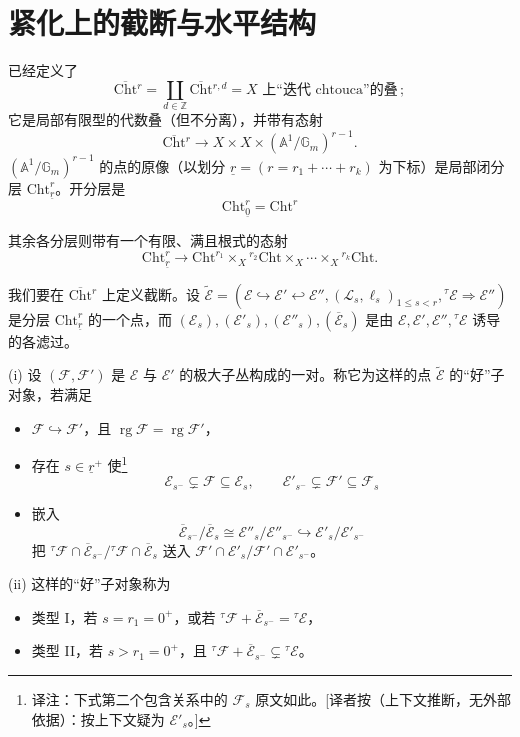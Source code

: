 \section{紧化上的截断与水平结构}

已经定义了
\[
\overline{\mathrm{Cht}}{}^r=\coprod_{d\in\mathbb{Z}}\overline{\mathrm{Cht}}{}^{r,d}=\text{$X$ 上“迭代 chtouca”的叠}\,;
\]
它是局部有限型的代数叠（但不分离），并带有态射
\[
\overline{\mathrm{Cht}}{}^r\to X\times X\times(\mathbb{A}^1/\mathbb{G}_m)^{r-1}.
\]
$(\mathbb{A}^1/\mathbb{G}_m)^{r-1}$ 的点的原像（以划分 $\underline{r}=(r=r_1+\cdots+r_k)$ 为下标）是局部闭分层 $\mathrm{Cht}^r_{\underline{r}}$。开分层是
\[
\mathrm{Cht}^r_{\underline{0}}=\mathrm{Cht}^r
\]

其余各分层则带有一个有限、满且根式的态射
\[
\mathrm{Cht}^r_{\underline{r}}\to\mathrm{Cht}^{r_1}\times_X{}^{r_2}\mathrm{Cht}\times_X\cdots\times_X{}^{r_k}\mathrm{Cht}.
\]

我们要在 $\overline{\mathrm{Cht}}{}^r$ 上定义截断。设 $\tilde{\mathcal{E}}=(\mathcal{E}\hookrightarrow\mathcal{E}'\hookleftarrow\mathcal{E}'',(\mathcal{L}_s,\ell_s)_{1\le s<r},{}^{\tau}\mathcal{E}\Rightarrow\mathcal{E}'')$ 是分层 $\mathrm{Cht}^r_{\underline{r}}$ 的一个点，而 $(\mathcal{E}_s),(\mathcal{E}'_s),(\mathcal{E}''_s),(\overline{\mathcal{E}}_s)$ 是由 $\mathcal{E},\mathcal{E}',\mathcal{E}'',{}^\tau\mathcal{E}$ 诱导的各滤过。

\begin{definition*}
(i) 设 $(\mathcal{F},\mathcal{F}')$ 是 $\mathcal{E}$ 与 $\mathcal{E}'$ 的极大子丛构成的一对。称它为这样的点 $\tilde{\mathcal{E}}$ 的“好”子对象，若满足

\begin{itemize}
\item $\mathcal{F}\hookrightarrow\mathcal{F}'$，且 $\operatorname{rg}\mathcal{F}=\operatorname{rg}\mathcal{F}'$，
\item 存在 $s\in\underline{r}^+$ 使\footnote{译注：下式第二个包含关系中的 $\mathcal{F}_s$ 原文如此。[译者按（上下文推断，无外部依据）：按上下文疑为 $\mathcal{E}'_s$。]}
\[
\mathcal{E}_{s^-}\varsubsetneq\mathcal{F}\subseteq\mathcal{E}_s,\qquad\mathcal{E}'_{s^-}\varsubsetneq\mathcal{F}'\subseteq\mathcal{F}_s
\]
\item 嵌入
\[
\overline{\mathcal{E}}_{s^-}/\overline{\mathcal{E}}_s\cong\mathcal{E}''_s/\mathcal{E}''_{s^-}\hookrightarrow\mathcal{E}'_s/\mathcal{E}'_{s^-}
\]
把 ${}^\tau\mathcal{F}\cap\overline{\mathcal{E}}_{s^-}/{}^\tau\mathcal{F}\cap\overline{\mathcal{E}}_s$ 送入 $\mathcal{F}'\cap\mathcal{E}'_s/\mathcal{F}'\cap\mathcal{E}'_{s^-}$。
\end{itemize}

(ii) 这样的“好”子对象称为

\begin{itemize}
\item 类型 I，若 $s=r_1=0^+$，或若 ${}^\tau\mathcal{F}+\overline{\mathcal{E}}_{s^-}={}^\tau\mathcal{E}$，
\item 类型 II，若 $s>r_1=0^+$，且 ${}^\tau\mathcal{F}+\overline{\mathcal{E}}_{s^-}\subsetneq{}^\tau\mathcal{E}$。
\end{itemize}
\end{definition*}

